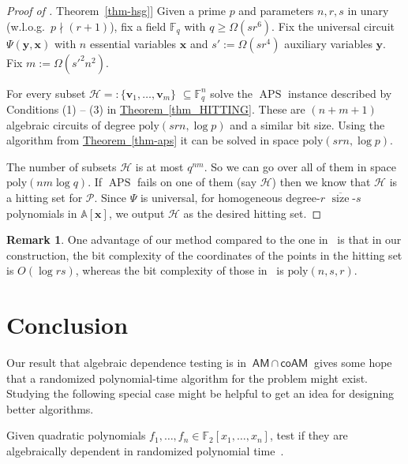 \documentclass[11pt]{article}
\numberwithin{equation}{section}
\theoremstyle{definition}
\newtheorem{remark}[theorem]{Remark}
\theoremstyle{plain}
\newcommand{\cclass}[1]{\textsf{#1}}
\newcommand{\expref}[2]{\hyperref[#2]{#1~\ref{#2}}}
\newcommand{\F}{\mathbb{F}}
\newcommand{\calH}{\mathcal{H}}
\newcommand{\calP}{\mathcal{P}}
\newcommand{\aff}{\mathbb{A}}
\DeclareMathOperator{\sz}{\mathrm{size}}
\newcommand{\ol}[1]{\overline{#1}}
\newcommand{\AM}{\cclass{AM}\xspace}  %
\newcommand{\coAM}{\cclass{coAM}\xspace}  %
\newcommand{\AMcapcoAM}{\AM\,\cap\,\coAM}  %
\DeclareMathOperator{\APS}{\mathrm{APS}\xspace} %
\begin{document}
\begin{proof}[Proof of \expref{Theorem}{thm-hsg}]
Given a prime $p$ and parameters $n, r, s$ in unary (w.l.o.g.\ $p\nmid(r+1)$), fix a field $\F_q$ with $q\ge\Omega(sr^6)$. Fix the universal circuit $\Psi(\mathbf{y},\mathbf{x})$ with $n$ essential variables $\mathbf{x}$ and $s':=\Omega(sr^4)$ auxiliary variables $\mathbf y$. Fix $m:=\Omega(s'^2n^2)$.

For every subset $\calH=:\{\mathbf v_1,\ldots, \mathbf v_m\}$ $\subseteq \F_q^n$ solve the $\APS$ instance described by 
Conditions 
%
(1) -- (3) %
in \expref{Theorem}{thm_HITTING}. These are $(n+m+1)$ algebraic circuits of degree 
%
$\mathrm{poly}(srn, \log p)$ and a similar bit size. %
Using the algorithm from \expref{Theorem}{thm-aps} it can be solved in 
%
space $\mathrm{poly}(srn, \log p)$. %

The number of subsets $\calH$ is 
at most %
$q^{nm}$. 
%
So we can go over all of them in space $\mathrm{poly}(nm\log q)$. %
If $\APS$ fails on one of them (say $\calH$) then we know that $\calH$ is a hitting set for $\calP$. Since $\Psi$ is universal, for homogeneous degree-$r$ $\ol{\sz}$-$s$ polynomials in $\aff[\mathbf x]$, we output $\calH$ as the desired hitting set.
\end{proof}

%
\begin{remark}   %
One advantage of our method compared to the one in~\cite{forbes2017pspace} is that
%
in our construction, the 
%
bit complexity of the coordinates of the points in the hitting set %
is $O(\log rs)$, whereas the
%
bit complexity of those in~\cite{forbes2017pspace} is  $\mathrm{poly}(n,s,r)$. %
\end{remark}

%

\section{Conclusion}\label{sec-conclusion}
%

Our result
%
that  %
algebraic dependence testing
is  %
in
%
$\AMcapcoAM$   %
gives
%
%
some hope   %
that a randomized
%
polynomial-time   %
algorithm for the problem
%
might exist.  %
Studying the following special case might be helpful to get an idea for designing better algorithms.

  Given quadratic polynomials $f_1,\ldots,f_n \in \F_2[x_1,\ldots,x_n]$, test if they are algebraically dependent in randomized polynomial time~\cite{pandey2016algebraic}.
  
\end{document}
